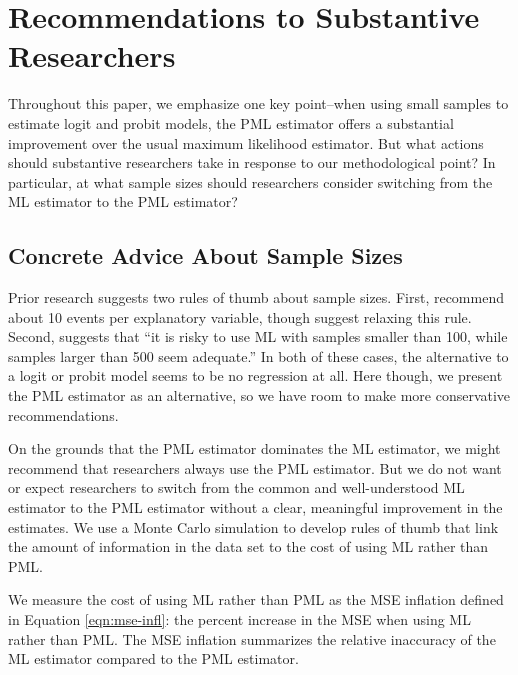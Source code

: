 \documentclass[12pt]{article}
\begin{document}
\section*{Recommendations to Substantive Researchers}

Throughout this paper, we emphasize one key point--when using small samples to estimate logit and probit models, the PML estimator offers a substantial improvement over the usual maximum likelihood estimator. 
But what actions should substantive researchers take in response to our methodological point? 
In particular, at what sample sizes should researchers consider switching from the ML estimator to the PML estimator?

\subsection*{Concrete Advice About Sample Sizes}

Prior research suggests two rules of thumb about sample sizes.
First, \cite{Peduzzietal1996} recommend about 10 events per explanatory variable, though \cite{VittinghoffMcCulloch2007} suggest relaxing this rule. 
Second, \citet[p. 54]{Long1997} suggests that ``it is risky to use ML with samples smaller than 100, while samples larger than 500 seem adequate.'' 
In both of these cases, the alternative to a logit or probit model seems to be no regression at all.
Here though, we present the PML estimator as an alternative, so we have room to make more conservative recommendations.

On the grounds that the PML estimator dominates the ML estimator, we might recommend that researchers always use the PML estimator. 
But we do not want or expect researchers to switch from the common and well-understood ML estimator to the PML estimator without a clear, meaningful improvement in the estimates. 
We use a Monte Carlo simulation to develop rules of thumb that link the amount of information in the data set to the cost of using ML rather than PML. 

We measure the cost of using ML rather than PML as the MSE inflation defined in Equation \ref{eqn:mse-infl}: the percent increase in the MSE when using ML rather than PML. 
The MSE inflation summarizes the relative inaccuracy of the ML estimator compared to the PML estimator.
\end{document}
